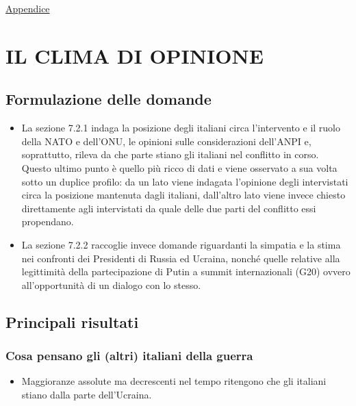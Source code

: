 \documentclass[
]{book}
\providecommand{\tightlist}{%
  \setlength{\itemsep}{0pt}\setlength{\parskip}{0pt}}
\begin{document}
\href{https://github.com/LucianaFazio/Ucrania/blob/main/PDF_Appendice/VI.\%20Gli\%20effetti\%20del\%20conflitto\%20v.3.pdf}{Appendice}

\hypertarget{il-clima-di-opinione}{%
\chapter{IL CLIMA DI OPINIONE}\label{il-clima-di-opinione}}

\hypertarget{formulazione-delle-domande-5}{%
\section{Formulazione delle domande}\label{formulazione-delle-domande-5}}

\begin{itemize}
\item
  La sezione 7.2.1 indaga la posizione degli italiani circa l'intervento e il ruolo della NATO e dell'ONU, le opinioni sulle considerazioni dell'ANPI e, soprattutto, rileva da che parte stiano gli italiani nel conflitto in corso. Questo ultimo punto è quello più ricco di dati e viene osservato a sua volta sotto un duplice profilo: da un lato viene indagata l'opinione degli intervistati circa la posizione mantenuta dagli italiani, dall'altro lato viene invece chiesto direttamente agli intervistati da quale delle due parti del conflitto essi propendano.
\item
  La sezione 7.2.2 raccoglie invece domande riguardanti la simpatia e la stima nei confronti dei Presidenti di Russia ed Ucraina, nonché quelle relative alla legittimità della partecipazione di Putin a summit internazionali (G20) ovvero all'opportunità di un dialogo con lo stesso.
\end{itemize}

\hypertarget{principali-risultati-5}{%
\section{Principali risultati}\label{principali-risultati-5}}

\hypertarget{cosa-pensano-gli-altri-italiani-della-guerra}{%
\subsection{Cosa pensano gli (altri) italiani della guerra}\label{cosa-pensano-gli-altri-italiani-della-guerra}}

\begin{itemize}
\tightlist
\item
  Maggioranze assolute ma decrescenti nel tempo ritengono che gli italiani stiano dalla parte dell'Ucraina.
\end{itemize}
\end{document}
